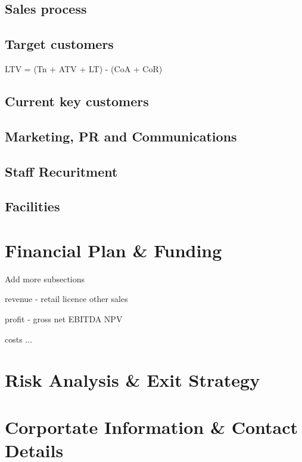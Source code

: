 \documentclass{article}
\begin{document}
  \subsection{Sales process}
  \subsection{Target customers}
   LTV = (Tn + ATV + LT) - (CoA + CoR) 
  \subsection{Current key customers}
  \subsection{Marketing, PR and Communications}

  \subsection{Staff Recuritment}
  \subsection{Facilities}


\section{Financial Plan & Funding}
Add more subsections

revenue
 - retail
   licence
   other sales

profit
 - gross
   net
   EBITDA
   NPV

costs
 ...

\section{Risk Analysis & Exit Strategy}



\section{Corportate Information & Contact Details}
\end{document}
